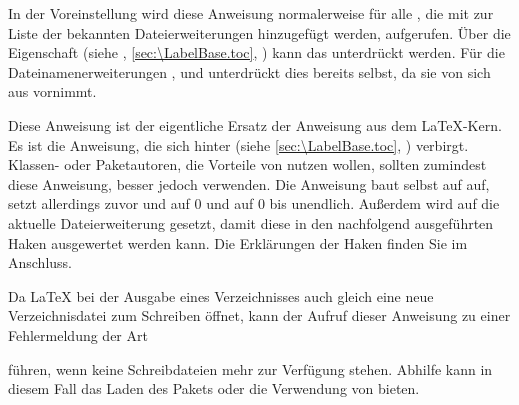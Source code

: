 In der Voreinstellung wird diese Anweisung normalerweise für alle
, die mit  zur
Liste der bekannten Dateierweiterungen hinzugefügt werden, aufgerufen. Über
die Eigenschaft  (siehe
, \autoref{sec:\LabelBase.toc},
) kann das unterdrückt werden. Für die
Dateinamenerweiterungen ,  und  unterdrückt
 dies bereits selbst, %
\iftrue%
da  sie von sich aus vornimmt.%
\else%
damit die Umschaltung nicht mehrfach in die zugehörigen Dateien
eingetragen wird.%
\fi

\EndIndexGroup


\begin{Declaration}
\end{Declaration}
Diese Anweisung ist der eigentliche Ersatz der Anweisung
 aus dem
\LaTeX-Kern. Es ist die Anweisung, die sich hinter
 (siehe \autoref{sec:\LabelBase.toc},
) verbirgt. Klassen- oder Paketautoren,
die Vorteile von  nutzen wollen, sollten zumindest diese
Anweisung, besser jedoch  verwenden. Die
Anweisung baut selbst auf  auf, setzt allerdings zuvor
 und
 auf 0 und
 auf 0 bis unendlich. Außerdem
wird  auf die
aktuelle Dateierweiterung gesetzt, damit diese in den nachfolgend ausgeführten
Haken ausgewertet werden kann. Die Erklärungen der Haken finden
Sie im Anschluss.

Da \LaTeX{} bei der Ausgabe eines Verzeichnisses auch
gleich eine neue Verzeichnisdatei zum Schreiben öffnet, kann der Aufruf dieser
Anweisung zu einer Fehlermeldung der Art
führen, wenn keine Schreibdateien mehr zur Verfügung stehen. Abhilfe kann in
diesem Fall das Laden des Pakets
\cite{package:scrwfile} oder die Verwendung von \LuaLaTeX{} bieten.%
\EndIndexGroup


